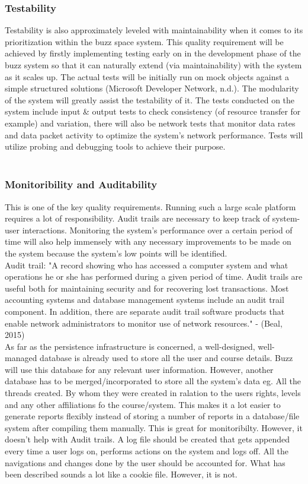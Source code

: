 \subsubsection{Testability}
Testability is also approximately leveled with maintainability when it comes to its prioritization within the buzz space system. This quality requirement will be achieved by firstly implementing testing early on in the development phase of the buzz system so that it can naturally extend (via maintainability) with the system as it scales up. The actual tests will be initially run on mock objects against a simple structured solutions (Microsoft Developer Network, n.d.). The modularity of the system will greatly assist the testability of it. The tests conducted on the system include input & output tests to check consistency (of resource transfer for example) and variation, there will also be network tests that monitor data rates and data packet activity to optimize the system’s network performance. Tests will utilize probing and debugging tools to achieve their purpose.\\
\\
\subsubsection{Monitoribility and Auditability}
This is one of the key  quality requirements. Running such a large scale platform requires a lot of responsibility. Audit trails are necessary to keep track of system-user interactions. Monitoring the system's performance over a certain period of time will also help immensely with any necessary improvements to be made on the system because the system's low points will be identified.\\
Audit trail: "A record showing who has accessed a computer system and what operations he or she has performed during a given period of time. Audit trails are useful both for maintaining security and for recovering lost transactions. Most accounting systems and database management systems include an audit trail component. In addition, there are separate audit trail software products that enable network administrators to monitor use of network resources." - (Beal, 2015)\\
As far as the persistence infrastructure is concerned, a well-designed, well-managed database is already used to store all the user and course details. Buzz will use this database for any relevant user information. However,  another database has to be merged/incorporated to store all the system's data eg. All the threads created. By whom they were created in ralation to the users rights, levels and any other affiliations fo the course/system. This makes it a lot easier to generate reports flexibly instead of storing a number of reports in a database/file system after compiling them manually. This is great for monitoribilty. However, it doesn't help with Audit trails. A log file should be created that gets appended every time a user logs on, performs actions on the system and logs off. All the navigations and changes done by the user should be accounted for. What has been described sounds a lot like a cookie file. However, it is not.\\
\\
